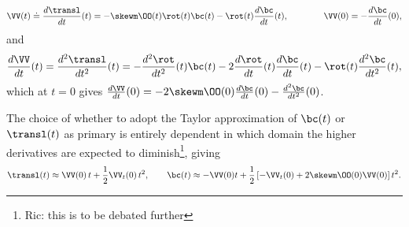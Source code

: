 %
%
\begin{equation}\label{eq:vv:def}
\VV(t) \doteq \frac{d\transl}{dt}(t) = -\skewm\OO(t)\rot(t)\bc(t) -
\rot(t)\frac{d\bc}{dt}(t),
\qquad\qquad
\VV(0) = -\frac{d\bc}{dt}(0),
\end{equation}
and
\begin{equation}
\frac{d\VV}{dt}(t) = \frac{d^2\transl}{dt^2}(t) = -\frac{d^2 \rot}{dt^2}(t)\bc(t) -
2\frac{d\rot}{dt}(t)\frac{d\bc}{dt}(t) - \rot(t)\frac{d^2\bc}{dt^2}(t),
\end{equation}
which at $t=0$ gives $\frac{d\VV}{dt}(0) = -2\skewm\OO(0)\frac{d\bc}{dt}(0) -
\frac{d^2\bc}{dt^2}(0)$.

The choice of whether to adopt the Taylor approximation of $\bc(t)$ or
$\transl(t)$ as primary is entirely dependent in which domain the higher
derivatives are expected to diminish\footnote{Ric: this is to be debated
further}, giving
\begin{align}
\transl(t) \approx \VV(0)\,t + \frac{1}{2}\VV_{t}(0)\,t^2,
\qquad
\bc(t) \approx -\VV(0)t + \frac{1}{2} \left[ -\VV_t(0) +
2\skewm\OO(0)\VV(0) \right]t^2.
\end{align}

